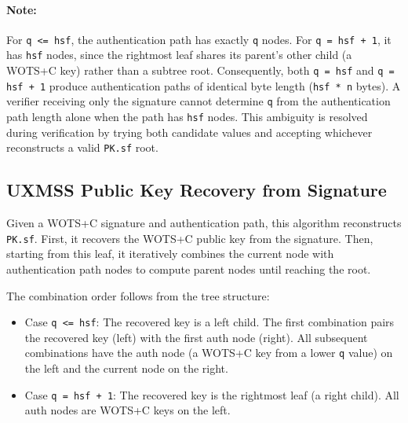 \paragraph{Note:} For \texttt{q <= hsf}, the authentication path has exactly \texttt{q} nodes. For \texttt{q = hsf + 1}, it has \texttt{hsf} nodes, since the rightmost leaf shares its parent's other child (a WOTS+C key) rather than a subtree root. Consequently, both \texttt{q = hsf} and \texttt{q = hsf + 1} produce authentication paths of identical byte length (\texttt{hsf * n} bytes). A verifier receiving only the signature cannot determine \texttt{q} from the authentication path length alone when the path has \texttt{hsf} nodes. This ambiguity is resolved during verification by trying both candidate values and accepting whichever reconstructs a valid \texttt{PK.sf} root.

\subsection{UXMSS Public Key Recovery from Signature}
Given a WOTS+C signature and authentication path, this algorithm reconstructs \texttt{PK.sf}. First, it recovers the WOTS+C public key from the signature. Then, starting from this leaf, it iteratively combines the current node with authentication path nodes to compute parent nodes until reaching the root.

The combination order follows from the tree structure:
\begin{itemize}
    \item Case \texttt{q <= hsf}: The recovered key is a left child. The first combination pairs the recovered key (left) with the first auth node (right). All subsequent combinations have the auth node (a WOTS+C key from a lower \texttt{q} value) on the left and the current node on the right.
    \item Case \texttt{q = hsf + 1}: The recovered key is the rightmost leaf (a right child). All auth nodes are WOTS+C keys on the left.
\end{itemize}

